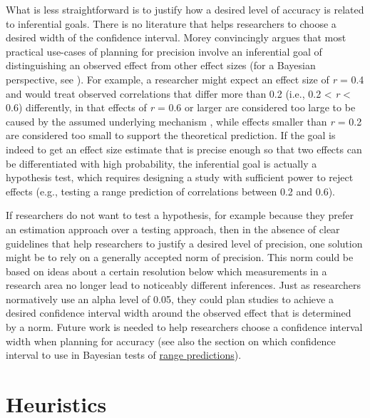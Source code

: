 \documentclass[
  oneside]{krantz}
\begin{document}
What is less straightforward is to justify how a desired level of accuracy is related to inferential goals. There is no literature that helps researchers to choose a desired width of the confidence interval. Morey \citeyearpar{morey_power_2020} convincingly argues that most practical use-cases of planning for precision involve an inferential goal of distinguishing an observed effect from other effect sizes (for a Bayesian perspective, see \citet{kruschke_rejecting_2018}). For example, a researcher might expect an effect size of \emph{r} = 0.4 and would treat observed correlations that differ more than 0.2 (i.e., 0.2 \textless{} \emph{r} \textless{} 0.6) differently, in that effects of \emph{r} = 0.6 or larger are considered too large to be caused by the assumed underlying mechanism \citep{hilgard_maximal_2021}, while effects smaller than \emph{r} = 0.2 are considered too small to support the theoretical prediction. If the goal is indeed to get an effect size estimate that is precise enough so that two effects can be differentiated with high probability, the inferential goal is actually a hypothesis test, which requires designing a study with sufficient power to reject effects (e.g., testing a range prediction of correlations between 0.2 and 0.6).

If researchers do not want to test a hypothesis, for example because they prefer an estimation approach over a testing approach, then in the absence of clear guidelines that help researchers to justify a desired level of precision, one solution might be to rely on a generally accepted norm of precision. This norm could be based on ideas about a certain resolution below which measurements in a research area no longer lead to noticeably different inferences. Just as researchers normatively use an alpha level of 0.05, they could plan studies to achieve a desired confidence interval width around the observed effect that is determined by a norm. Future work is needed to help researchers choose a confidence interval width when planning for accuracy (see also the section on which confidence interval to use in Bayesian tests of \protect\hyperlink{whichinterval}{range predictions}).

\hypertarget{heuristics}{%
\section{Heuristics}\label{heuristics}}
\end{document}
